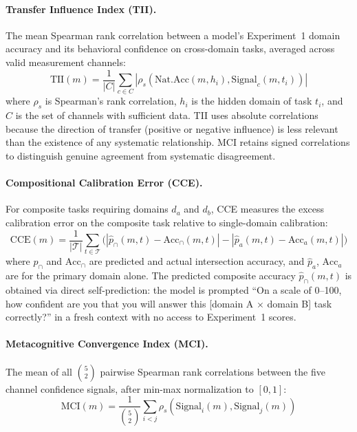 \documentclass[10pt]{article}
\newcommand{\MCI}{MCI}
\newcommand{\CCE}{CCE}
\newcommand{\TII}{TII}
\begin{document}
\paragraph{Transfer Influence Index (\TII{}).}
The mean Spearman rank correlation between a model's Experiment~1 domain accuracy and its behavioral confidence on cross-domain tasks, averaged across valid measurement channels:
\begin{equation}
\text{TII}(m) = \frac{1}{|C|} \sum_{c \in C} |\rho_s(\text{Nat.Acc}(m, h_i), \text{Signal}_c(m, t_i))|
\end{equation}
where $\rho_s$ is Spearman's rank correlation, $h_i$ is the hidden domain of task $t_i$, and $C$ is the set of channels with sufficient data.
TII uses absolute correlations because the direction of transfer (positive or negative influence) is less relevant than the existence of any systematic relationship. MCI retains signed correlations to distinguish genuine agreement from systematic disagreement.

\paragraph{Compositional Calibration Error (\CCE{}).}
For composite tasks requiring domains $d_a$ and $d_b$, CCE measures the excess calibration error on the composite task relative to single-domain calibration:
\begin{equation}
\text{CCE}(m) = \frac{1}{|\mathcal{T}|} \sum_{t \in \mathcal{T}} \bigl(|\hat{p}_{\cap}(m,t) - \text{Acc}_{\cap}(m,t)| - |\hat{p}_{a}(m,t) - \text{Acc}_{a}(m,t)|\bigr)
\label{eq:cce}
\end{equation}
where $\hat{p}_{\cap}$ and $\text{Acc}_{\cap}$ are predicted and actual intersection accuracy, and $\hat{p}_a$, $\text{Acc}_a$ are for the primary domain alone.
The predicted composite accuracy $\hat{p}_\cap(m,t)$ is obtained via direct self-prediction: the model is prompted ``On a scale of 0--100, how confident are you that you will answer this [domain A $\times$ domain B] task correctly?'' in a fresh context with no access to Experiment~1 scores.

\paragraph{Metacognitive Convergence Index (\MCI{}).}
The mean of all $\binom{5}{2}$ pairwise Spearman rank correlations between the five channel confidence signals, after min-max normalization to $[0,1]$:
\begin{equation}
\text{MCI}(m) = \frac{1}{\binom{5}{2}} \sum_{i < j} \rho_s(\text{Signal}_i(m), \text{Signal}_j(m))
\end{equation}
\end{document}
